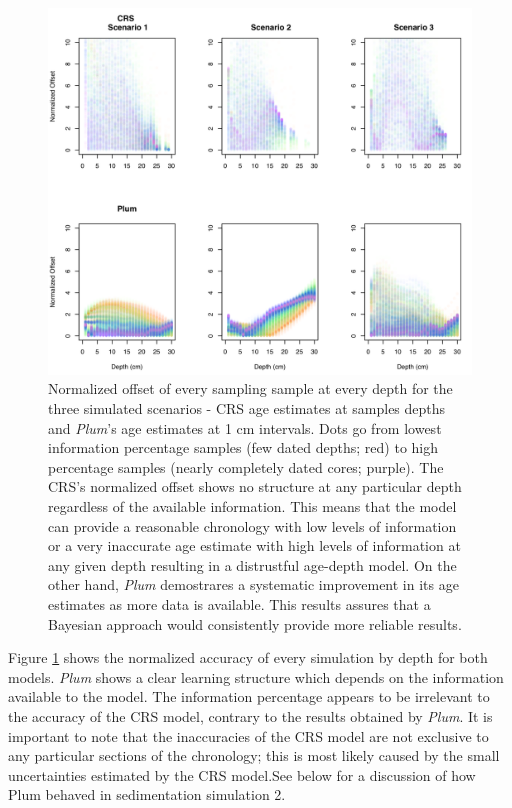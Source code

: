 \documentclass [10pt] {article}
\begin{document}
\begin{figure}[!]
	\begin{centering}
		\includegraphics[width=\linewidth]{depths.png}
		\caption{Normalized offset of every sampling sample at every depth for the three simulated scenarios - CRS age estimates at samples depths and \textit{Plum}'s age estimates at 1 cm intervals. Dots go from lowest information percentage samples (few dated depths; red) to high percentage samples (nearly completely dated cores; purple). The CRS's normalized offset shows no structure at any particular depth regardless of the available information. This means that the model can provide a reasonable chronology with low levels of information or a very inaccurate age estimate with high levels of information at any given depth resulting in a distrustful age-depth model. On the other hand, \textit{Plum} demostrares a systematic improvement in its age estimates as more data is available. This results assures that a Bayesian approach would consistently provide more reliable results.     }
		\label{fig:depths}
	\end{centering}
\end{figure}

Figure \ref{fig:depths} shows the normalized accuracy of every simulation by depth for both models.
\textit{Plum} shows a clear learning structure which depends on the information available to the model.
The information percentage appears to be irrelevant to the accuracy of the CRS model, contrary to the results obtained by \textit{Plum}.
It is important to note that the inaccuracies of the CRS model are not exclusive to any particular sections of the chronology; this is most likely caused by the small uncertainties estimated by the CRS model.See below for a discussion of how Plum behaved in sedimentation simulation 2.   
\end{document}
